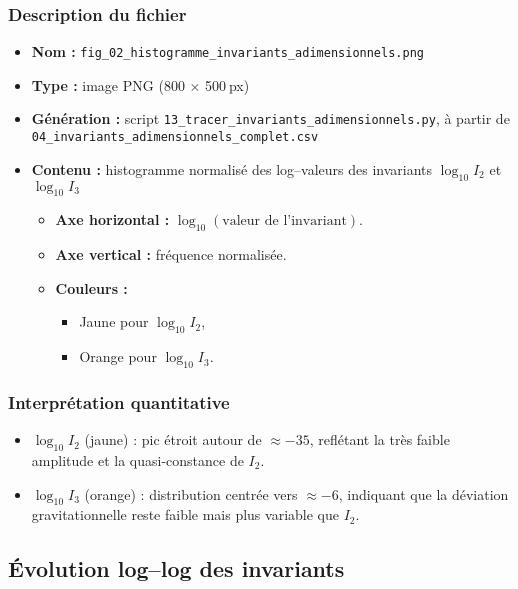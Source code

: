 \subsubsection*{Description du fichier}
\begin{itemize}
  \item \textbf{Nom :} \texttt{fig\_02\_histogramme\_invariants\_adimensionnels.png}  
  \item \textbf{Type :} image PNG (800 × 500 px)  
  \item \textbf{Génération :} script \texttt{13\_tracer\_invariants\_adimensionnels.py}, à partir de \texttt{04\_invariants\_adimensionnels\_complet.csv}  
  \item \textbf{Contenu :} histogramme normalisé des log–valeurs des invariants  
    \(
      \log_{10}I_{2}
    \)
    et
    \(
      \log_{10}I_{3}
    \)
    \begin{itemize}
      \item \textbf{Axe horizontal :} \(\log_{10}(\text{valeur de l’invariant})\).  
      \item \textbf{Axe vertical :} fréquence normalisée.  
      \item \textbf{Couleurs :}  
        \begin{itemize}
          \item Jaune pour \(\log_{10}I_{2}\),  
          \item Orange pour \(\log_{10}I_{3}\).  
        \end{itemize}
    \end{itemize}
\end{itemize}

\subsubsection*{Interprétation quantitative}
\begin{itemize}
  \item \(\log_{10}I_{2}\) (jaune) : pic étroit autour de \(\approx -35\), reflétant la très faible amplitude et la quasi-constance de \(I_{2}\).  
  \item \(\log_{10}I_{3}\) (orange) : distribution centrée vers \(\approx -6\), indiquant que la déviation gravitationnelle reste faible mais plus variable que \(I_{2}\).  
\end{itemize}

\bigskip
\subsection{Évolution log–log des invariants}

